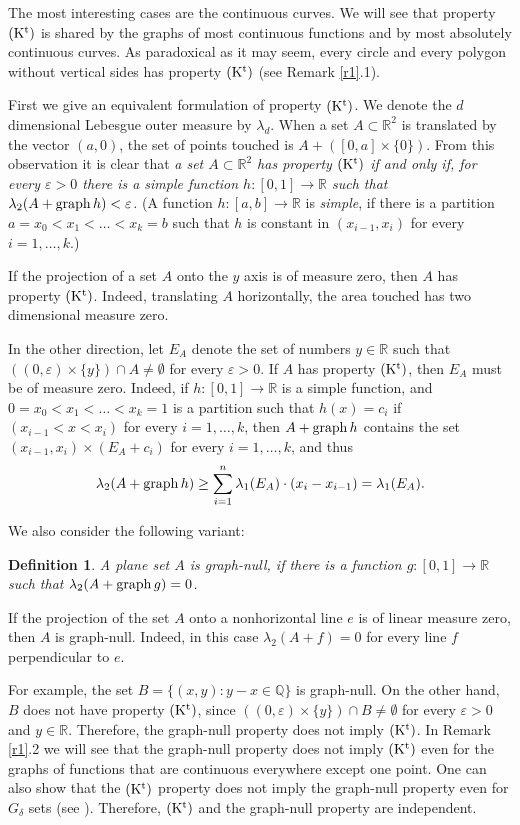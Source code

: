 \documentclass[12pt]{article}
\newtheorem{defin}[theorem]{Definition}
\def\rr{{\mathbb R}}
\def\qq{{\mathbb Q}}
\def\sik{{\rr}^2}
\def\su{\subset}
\def\de{\delta}
\def\ep{\varepsilon}
\def\la{\lambda}
\def\cd{\cdot}
\def\stb{,\ldots ,}
\def\emp{\emptyset}
\def\sumin{\sum_{i=1}^n}
\def\nl{[0,1]}
\def\graph{{\rm graph}\, }
\begin{document}
The most interesting cases are the continuous curves. 
We will see that property ${\rm (K^t)}$ is shared by the graphs of most
continuous functions and by most absolutely continuous curves.
As paradoxical as it may seem, every circle and every polygon without
vertical sides has property ${\rm (K^t)}$ (see Remark \ref{r1}.1).

First we give an equivalent formulation of property ${\rm (K^t)}$.
We denote the $d$ dimensional Lebesgue outer measure by $\la _d$.
When a set $A\su \sik$ is translated by the vector $(a,0)$, the set of points
touched is $A+ ([0,a]\times \{0\} )$. From this observation it is clear
that {\it a set $A\su \sik$ has property ${\rm (K^t)}$ if and only if, for
every $\ep >0$  there is a simple function $h\colon \nl \to \rr$ such that 
$\la _2 (A+\graph h)<\ep$.}
(A function $h\colon [a,b]\to \rr$ is {\it simple}, if there is a partition
$a=x_0 <x_1 <\ldots <x_k =b$ such that $h$ is constant in $(x_{i-1} ,x_i )$
for every $i=1\stb k$.)

If the projection of a set $A$ onto the $y$ axis is of measure zero, then
$A$ has property ${\rm (K^t)}$. Indeed, translating $A$
horizontally, the area touched has two dimensional measure zero. 

In the other direction, let $E_A$ denote the set of numbers $y\in \rr$ such
that $((0, \ep )\times \{ y\})\cap A \ne \emp$ for every $\ep >0$. If
$A$ has property ${\rm (K^t)}$, then $E_A$ must be of measure zero. Indeed,
if $h\colon \nl\to \rr$ is a simple function, and $0=x_0 <x_1 <\ldots <x_k =1$
is a partition such that $h(x)=c_i$ if $(x_{i-1} <x<x_i )$ for every $i=1\stb k$,
then $A+\graph h$ contains the set $(x_{i-1} ,x_i ) \times (E_A +c_i )$ for every
$i=1\stb k$, and thus
$$\la _2 (A+\graph h)\ge \sumin \la _1 (E_A )\cd (x_i -x_{i-1} )=\la _1 (E_A ).$$

We also consider the following variant:
\begin{defin}
{\rm A plane set $A$ is} graph-null, {\rm if there is a function 
$g\colon \nl \to \rr$ such that $\la _2 (A+\graph g)=0$.}
\end{defin}
If the projection of the set $A$ onto a nonhorizontal line $e$ is of linear
measure zero, then $A$ is graph-null. Indeed, in this case $\la _2 (A+f)=0$
for every line $f$ perpendicular to $e$. 

For example, the set $B=\{ (x,y)\colon y-x\in \qq \}$ is graph-null. On the
other hand, $B$ does not have property ${\rm (K^t)}$, since $((0,\ep )\times
\{ y\} )\cap B\ne \emp$ for every $\ep >0$ and $y\in \rr$. Therefore, the
graph-null property does not imply ${\rm (K^t)}$. In Remark \ref{r1}.2 we
will see that the graph-null property does not imply ${\rm (K^t)}$ even
for the graphs of functions that are continuous everywhere except one point.
One can also show that the ${\rm (K^t)}$ property does not imply the
graph-null property even for $G_\de$ sets (see \cite{M}). Therefore,
${\rm (K^t)}$ and the graph-null property are independent.
\end{document}
